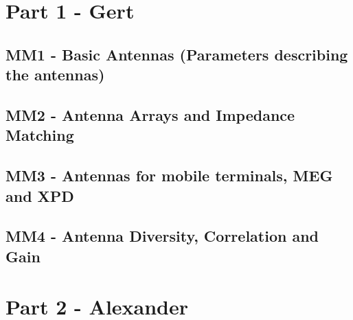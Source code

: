 



    \singlespacing
    \pagestyle{empty}	
	
	\cleardoublepage
	
	\pagestyle{plain}
		
	\tableofcontents 
	\onehalfspacing
	\pagestyle{fancy} %
    \setcounter{page}{0} %

\part{Part 1 - Gert}

\chapter{MM1 - Basic Antennas (Parameters describing the antennas)}





\chapter{MM2 - Antenna Arrays and Impedance Matching}



\chapter{MM3 - Antennas for mobile terminals, MEG and XPD}






\chapter{MM4 - Antenna Diversity, Correlation and Gain}
% 




\part{Part 2 - Alexander}

